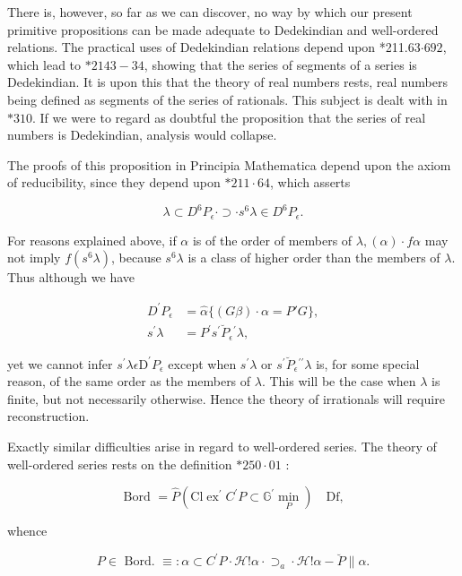 \documentclass[10pt]{article}
\begin{document}
There is, however, so far as we can discover, no way by which our present primitive propositions can be made adequate to Dedekindian and well-ordered relations. The practical uses of Dedekindian relations depend upon *211.63$\cdot 692$, which lead to $* 2143-34$, showing that the series of segments of a series is Dedekindian. It is upon this that the theory of real numbers rests, real numbers being defined as segments of the series of rationals. This subject is dealt with in $* 310$. If we were to regard as doubtful the proposition that the series of real numbers is Dedekindian, analysis would collapse.

The proofs of this proposition in Principia Mathematica depend upon the axiom of reducibility, since they depend upon $* 211 \cdot 64$, which asserts

$$
\lambda \subset D^{6} P_{\epsilon} \cdot \supset \cdot s^{6} \lambda \in D^{6} P_{\epsilon} .
$$

For reasons explained above, if $\alpha$ is of the order of members of $\lambda,(\alpha) \cdot f \alpha$ may not imply $f\left(s^{6} \lambda\right)$, because $s^{6} \lambda$ is a class of higher order than the members of $\lambda$. Thus although we have

$$
\begin{aligned}
D^{\prime} P_{\epsilon} & =\hat{\alpha}\{(G \beta) \cdot \alpha=P \prime G\}, \\
s^{\prime} \lambda & =P^{\prime} s^{\prime} \breve{P}_{\epsilon}{ }^{\prime} \lambda,
\end{aligned}
$$

yet we cannot infer $s^{\prime} \lambda \epsilon \mathrm{D}^{\prime} P_{\epsilon}$ except when $s^{\prime} \lambda$ or $s^{\prime} \breve{P}_{\epsilon}{ }^{\prime \prime} \lambda$ is, for some special reason, of the same order as the members of $\lambda$. This will be the case when $\lambda$ is finite, but not necessarily otherwise. Hence the theory of irrationals will require reconstruction.

Exactly similar difficulties arise in regard to well-ordered series. The theory of well-ordered series rests on the definition $* 250 \cdot 01$ :

$$
\text { Bord }=\hat{P}\left(\mathrm{Cl} \operatorname{ex}^{\prime} C^{\prime} P \subset \mathbb{G}^{\prime} \min _{P}\right) \quad \mathrm{Df} \text {, }
$$

whence

$$
P \in \text { Bord. } \equiv: \alpha \subset C^{\prime} P \cdot \mathcal{H}!\alpha \cdot \supset_{a} \cdot \mathcal{H}!\alpha-\breve{P} \| \alpha .
$$
\end{document}

